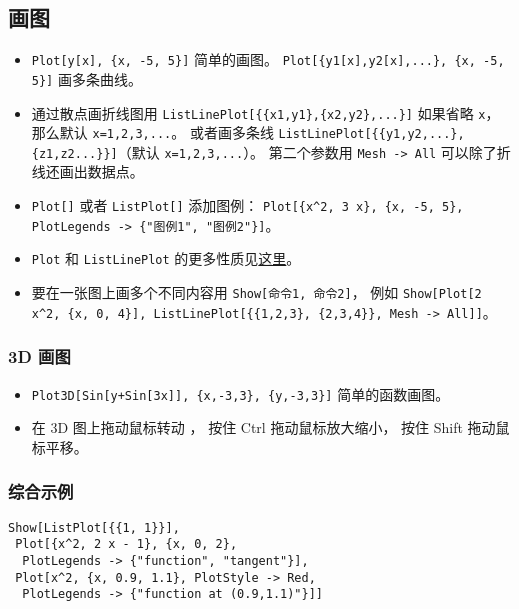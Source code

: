 \subsection{画图}
\begin{itemize}
\item \verb|Plot[y[x], {x, -5, 5}]| 简单的画图。 \verb|Plot[{y1[x],y2[x],...}, {x, -5, 5}]| 画多条曲线。
\item 通过散点画折线图用 \verb|ListLinePlot[{{x1,y1},{x2,y2},...}]| 如果省略 \verb|x|， 那么默认 \verb|x=1,2,3,...|。 或者画多条线 \verb|ListLinePlot[{{y1,y2,...},{z1,z2...}}]|（默认 \verb|x=1,2,3,...|）。 第二个参数用 \verb|Mesh -> All| 可以除了折线还画出数据点。
\item \verb|Plot[]| 或者 \verb|ListPlot[]| 添加图例： \verb|Plot[{x^2, 3 x}, {x, -5, 5}, PlotLegends -> {"图例1", "图例2"}]|。
\item \verb|Plot| 和 \verb|ListLinePlot| 的更多性质见\href{https://reference.wolfram.com/language/ref/Plot.html}{这里}。
\item 要在一张图上画多个不同内容用 \verb|Show[命令1, 命令2]|， 例如 \verb|Show[Plot[2 x^2, {x, 0, 4}], ListLinePlot[{{1,2,3}, {2,3,4}}, Mesh -> All]]|。
\end{itemize}

\subsubsection{3D 画图}
\begin{itemize}
\item \verb|Plot3D[Sin[y+Sin[3x]], {x,-3,3}, {y,-3,3}]| 简单的函数画图。
\item 在 3D 图上拖动鼠标转动 ， 按住 Ctrl 拖动鼠标放大缩小， 按住 Shift 拖动鼠标平移。
\end{itemize}

\subsubsection{综合示例}
\begin{lstlisting}[language=mma]
Show[ListPlot[{{1, 1}}],
 Plot[{x^2, 2 x - 1}, {x, 0, 2},
  PlotLegends -> {"function", "tangent"}],
 Plot[x^2, {x, 0.9, 1.1}, PlotStyle -> Red, 
  PlotLegends -> {"function at (0.9,1.1)"}]]
\end{lstlisting}



